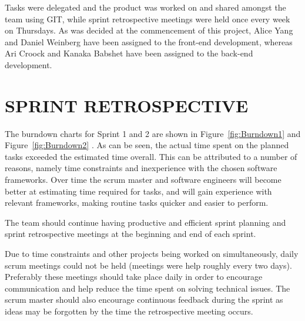 \documentclass[10pt,twocolumn]{witseiepaper}
\begin{document}
	Tasks were delegated and the product was worked on and shared amongst the team using GIT, while sprint retrospective meetings were held once every week on Thursdays.
	\newline
	\newline	
	As was decided at the commencement of this project, Alice Yang and Daniel Weinberg have been assigned to the front-end development, whereas Ari Croock and Kanaka Babshet have been assigned to the back-end development. 
	
	
	
	\section{SPRINT RETROSPECTIVE}
	
	The burndown charts for Sprint 1 and 2 are shown in Figure~\ref{fig:Burndown1} and Figure~\ref{fig:Burndown2} . As can be seen, the actual time spent on the planned tasks exceeded the estimated time overall. This can be attributed to a number of reasons, namely time constraints and inexperience with the chosen software frameworks. Over time the scrum master and software engineers will become better at estimating time required for tasks, and will gain experience with relevant frameworks, making routine tasks quicker and easier to perform.
	
	The team should continue having productive and efficient sprint planning and sprint retrospective meetings at the beginning and end of each sprint. 
	
	Due to time constraints and other projects being worked on simultaneously, daily scrum meetings could not be held (meetings were help roughly every two days). Preferably these meetings should take place daily in order to encourage communication and help reduce the time spent on solving technical issues. 
	The scrum master should also encourage continuous feedback during the sprint as ideas may be forgotten by the time the retrospective meeting occurs.
	
\end{document}
